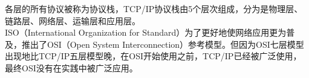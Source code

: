 各层的所有协议被称为协议栈，TCP/IP协议栈由5个层次组成，分为是物理层、链路层、网络层、运输层和应用层。\\

ISO（International Organization for Standard）为了更好地使网络应用更为普及，推出了OSI（Open System Interconnection）参考模型。但因为OSI七层模型出现地比TCP/IP五层模型晚，在OSI开始使用之前，TCP/IP已经被广泛使用，最终OSI没有在实践中被广泛应用。\\

\begin{table}[H]
    \centering
    \caption{OSI七层模型}
\end{table}

\vspace{0.5cm}

